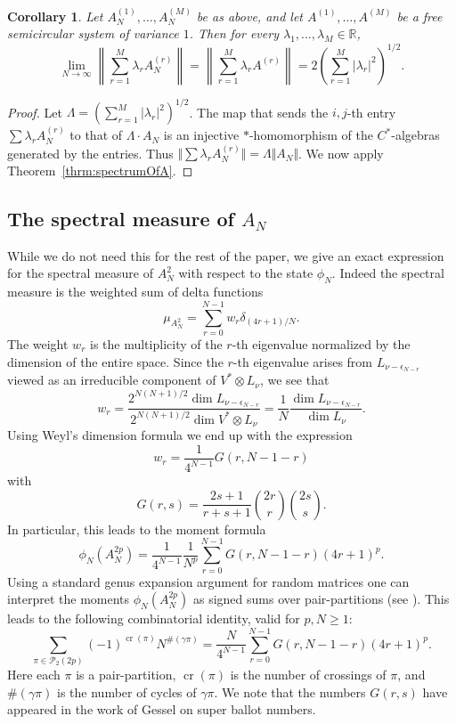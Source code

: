 \documentclass[11pt]{article}
\newtheorem{corollary}{Corollary}
\begin{document}
\begin{corollary}
Let \(A_N^{(1)},\ldots,A_N^{(M)}\) be as above, and let \(A^{(1)},\ldots,A^{(M)}\) be a free semicircular system
of variance \(1\). Then for every
\(\lambda_1,\ldots,\lambda_M\in \mathbb R\),
\[
\lim_{N\to\infty}
\left\|
\sum_{r=1}^M \lambda_r A_N^{(r)}
\right\|
=
\left\|
\sum_{r=1}^M \lambda_r A^{(r)}
\right\|
=2\left(\sum_{r=1}^M |\lambda_r|^2\right)^{1/2}.
\]
\end{corollary}

\begin{proof}
Let $\Lambda = (\sum_{r=1}^M |\lambda_r|^2)^{1/2}$.  The map that sends the $i,j$-th entry $\sum \lambda_r A_N^{(r)}$ to that of $\Lambda\cdot  A_N$ is an injective $*$-homomorphism of the  $C^*$-algebras generated by the entries.  Thus $\Vert \sum \lambda_r A_N^{(r)}\Vert = \Lambda \Vert A_N\Vert$.  We now apply Theorem~\ref{thrm:spectrumOfA}.
\end{proof}

\subsection{The spectral measure of $A_N$}\label{subsec:SpectralMeasureAN}

While we do not need this for the rest of the paper, we give an exact expression for the spectral measure of $A_N^2$ with respect to the state $\phi_N$.  Indeed the spectral measure is the weighted sum of delta functions $$\mu_{A_N^2}=\sum_{r=0}^{N-1} w_r \delta_{(4r+1)/N}.$$ The weight $w_r$ is the multiplicity of the $r$-th eigenvalue normalized by the dimension of the entire space. 
Since the $r$-th eigenvalue arises from $L_{\nu-\epsilon_{N-r}}$ viewed as an irreducible component of $V^*\otimes L_\nu$, we see that  $$w_r =  \frac{2^{N(N+1)/2}\dim L_{\nu-\epsilon_{N-r}}}{2^{N(N+1)/2}\dim V^*\otimes L_\nu}
= \frac{1}{N} \frac{\dim L_{\nu-\epsilon_{N-r}}}{\dim L_\nu}.$$  Using Weyl's dimension formula we end up with the expression
$$w_r = \frac{1}{4^{N-1}} G(r,N-1-r)$$ with
$$G(r,s)=\frac{2s+1}{r+s+1}\binom{2r}{r}\binom{2s}{s}.$$
In particular, this leads to the moment formula
\[
\phi_{N}(A^{2p}_N) =  \frac{1}{4^{N-1}} \frac{1}{N^p} \sum_{r=0}^{N-1} G(r,N-1-r)(4r+1)^p .
\]
Using a standard genus expansion argument for random matrices one can interpret the moments $\phi_N(A_N^{2p})$ as signed sums over pair-partitions (see \cite{Shlyakhtenko:Matrices}). This leads to the following combinatorial identity, valid for $p,N\geq 1$:
\begin{equation}\label{eq:MomentsAreSuperBallots}
\sum_{\pi \in \mathcal{P}_2(2p)} (-1)^{\operatorname{cr}(\pi)} N^{\#(\gamma\pi)} = \frac{N}{4^{N-1}} \sum_{r=0}^{N-1} G(r,N-1-r) (4r+1)^p.
\end{equation}
Here each $\pi$ is a pair-partition, $\operatorname{cr}(\pi)$ is the number of crossings of $\pi$, and $\#(\gamma\pi)$ is the number of cycles of $\gamma \pi$.  We note that the numbers $G(r,s)$ have appeared in the work of Gessel \cite{gessel} on super ballot numbers.
\end{document}
